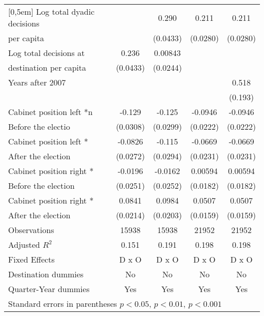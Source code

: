 \begin{table}[!ht]
\begin{tabular}{l*{4}{c}}
[0,5em]
Log total dyadic decisions&                     &       0.290\sym{***}&       0.211\sym{***}&       0.211\sym{***}\\
per capita                    &                     &    (0.0433)         &    (0.0280)         &    (0.0280)         \\
[0,5em]
Log total decisions at&       0.236\sym{***}&     0.00843         &                     &                     \\
 destination per capita                    &    (0.0433)         &    (0.0244)         &                     &                     \\
[0,5em]
Years after 2007    &                     &                     &                     &       0.518\sym{**} \\
                    &                     &                     &                     &     (0.193)         \\
[0,5em]
Cabinet position left *n&      -0.129\sym{***}&      -0.125\sym{***}&     -0.0946\sym{***}&     -0.0946\sym{***}\\
 Before the electio                    &    (0.0308)         &    (0.0299)         &    (0.0222)         &    (0.0222)         \\
[0,5em]
Cabinet position left *&     -0.0826\sym{**} &      -0.115\sym{***}&     -0.0669\sym{**} &     -0.0669\sym{**} \\
 After the election                    &    (0.0272)         &    (0.0294)         &    (0.0231)         &    (0.0231)         \\
[0,5em]
Cabinet position right *&     -0.0196         &     -0.0162         &     0.00594         &     0.00594         \\
  Before the election                   &    (0.0251)         &    (0.0252)         &    (0.0182)         &    (0.0182)         \\
[0,5em]
Cabinet position right *&      0.0841\sym{***}&      0.0984\sym{***}&      0.0507\sym{**} &      0.0507\sym{**} \\
 After the election                    &    (0.0214)         &    (0.0203)         &    (0.0159)         &    (0.0159)         \\
\hline
Observations        &       15938         &       15938         &       21952         &       21952         \\
Adjusted \(R^{2}\)  &       0.151         &       0.191         &       0.198         &       0.198         \\
Fixed Effects       &       D x O         &       D x O         &       D x O         &       D x O         \\
Destination dummies &          No         &          No         &          No         &          No         \\
Quarter-Year dummies&         Yes         &         Yes         &         Yes         &         Yes         \\
\hline\hline
\multicolumn{5}{l}{Standard errors in parentheses \sym{*} \(p<0.05\), \sym{**} \(p<0.01\), \sym{***} \(p<0.001\)}\\
\end{tabular}
\end{table}
